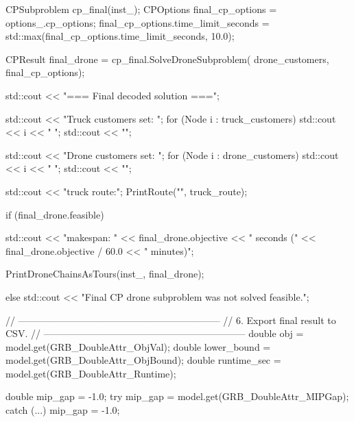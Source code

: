 {{{{                CPSubproblem cp_final(inst_);
                CPOptions final_cp_options = options_.cp_options;
                final_cp_options.time_limit_seconds =
                    std::max(final_cp_options.time_limit_seconds, 10.0);

                CPResult final_drone = cp_final.SolveDroneSubproblem(
                    drone_customers,
                    final_cp_options);

                std::cout << "\n=== Final decoded solution ===\n";

                std::cout << "Truck customers set: ";
                for (Node i : truck_customers)
                {
                    std::cout << i << " ";
                }
                std::cout << "\n";

                std::cout << "Drone customers set: ";
                for (Node i : drone_customers)
                {
                    std::cout << i << " ";
                }
                std::cout << "\n";

                std::cout << "\nOrdered truck route:\n  ";
                PrintRoute("", truck_route);

                if (final_drone.feasible)
                {
                    std::cout << "\nDrone makespan: "
                              << final_drone.objective
                              << " seconds ("
                              << final_drone.objective / 60.0
                              << " minutes)\n";

                    PrintDroneChainsAsTours(inst_, final_drone);
                }
                else
                {
                    std::cout << "\n[WARN] Final CP drone subproblem was not solved feasible.\n";
                }

                // ---------------------------------------------------------------
                // 6. Export final result to CSV.
                // ---------------------------------------------------------------
                double obj = model.get(GRB_DoubleAttr_ObjVal);
                double lower_bound = model.get(GRB_DoubleAttr_ObjBound);
                double runtime_sec = model.get(GRB_DoubleAttr_Runtime);

                double mip_gap = -1.0;
                try
                {
                    mip_gap = model.get(GRB_DoubleAttr_MIPGap);
                }
                catch (...)
                {
                    mip_gap = -1.0;
                }

}}}}
